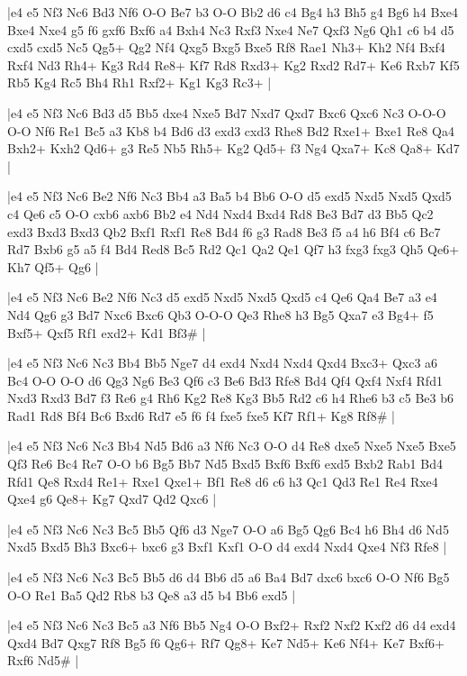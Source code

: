 \whitename{}
\blackname{}
\makegametitle
|e4 e5 Nf3 Nc6 Bd3 Nf6 O-O Be7 b3 O-O Bb2 d6 c4 Bg4 h3 Bh5 g4 Bg6 h4 Bxe4 Bxe4 Nxe4 g5 f6 gxf6 Bxf6 a4 Bxh4 Nc3 Rxf3 Nxe4 Ne7 Qxf3 Ng6 Qh1 c6 b4 d5 cxd5 cxd5 Nc5 Qg5+ Qg2 Nf4 Qxg5 Bxg5 Bxe5 Rf8 Rae1 Nh3+ Kh2 Nf4 Bxf4 Rxf4 Nd3 Rh4+ Kg3 Rd4 Re8+ Kf7 Rd8 Rxd3+ Kg2 Rxd2 Rd7+ Ke6 Rxb7 Kf5 Rb5 Kg4 Rc5 Bh4 Rh1 Rxf2+ Kg1 Kg3 Rc3+  |

\whitename{}
\blackname{}
\makegametitle
|e4 e5 Nf3 Nc6 Bd3 d5 Bb5 dxe4 Nxe5 Bd7 Nxd7 Qxd7 Bxc6 Qxc6 Nc3 O-O-O O-O Nf6 Re1 Bc5 a3 Kb8 b4 Bd6 d3 exd3 cxd3 Rhe8 Bd2 Rxe1+ Bxe1 Re8 Qa4 Bxh2+ Kxh2 Qd6+ g3 Re5 Nb5 Rh5+ Kg2 Qd5+ f3 Ng4 Qxa7+ Kc8 Qa8+ Kd7  |

\whitename{}
\blackname{}
\makegametitle
|e4 e5 Nf3 Nc6 Be2 Nf6 Nc3 Bb4 a3 Ba5 b4 Bb6 O-O d5 exd5 Nxd5 Nxd5 Qxd5 c4 Qe6 c5 O-O cxb6 axb6 Bb2 e4 Nd4 Nxd4 Bxd4 Rd8 Be3 Bd7 d3 Bb5 Qc2 exd3 Bxd3 Bxd3 Qb2 Bxf1 Rxf1 Re8 Bd4 f6 g3 Rad8 Be3 f5 a4 h6 Bf4 c6 Bc7 Rd7 Bxb6 g5 a5 f4 Bd4 Red8 Bc5 Rd2 Qc1 Qa2 Qe1 Qf7 h3 fxg3 fxg3 Qh5 Qe6+ Kh7 Qf5+ Qg6  |

\whitename{}
\blackname{}
\makegametitle
|e4 e5 Nf3 Nc6 Be2 Nf6 Nc3 d5 exd5 Nxd5 Nxd5 Qxd5 c4 Qe6 Qa4 Be7 a3 e4 Nd4 Qg6 g3 Bd7 Nxc6 Bxc6 Qb3 O-O-O Qe3 Rhe8 h3 Bg5 Qxa7 e3 Bg4+ f5 Bxf5+ Qxf5 Rf1 exd2+ Kd1 Bf3\#  |

\whitename{}
\blackname{}
\makegametitle
|e4 e5 Nf3 Nc6 Nc3 Bb4 Bb5 Nge7 d4 exd4 Nxd4 Nxd4 Qxd4 Bxc3+ Qxc3 a6 Bc4 O-O O-O d6 Qg3 Ng6 Be3 Qf6 c3 Be6 Bd3 Rfe8 Bd4 Qf4 Qxf4 Nxf4 Rfd1 Nxd3 Rxd3 Bd7 f3 Re6 g4 Rh6 Kg2 Re8 Kg3 Bb5 Rd2 c6 h4 Rhe6 b3 c5 Be3 b6 Rad1 Rd8 Bf4 Bc6 Bxd6 Rd7 e5 f6 f4 fxe5 fxe5 Kf7 Rf1+ Kg8 Rf8\#  |

\whitename{}
\blackname{}
\makegametitle
|e4 e5 Nf3 Nc6 Nc3 Bb4 Nd5 Bd6 a3 Nf6 Nc3 O-O d4 Re8 dxe5 Nxe5 Nxe5 Bxe5 Qf3 Re6 Bc4 Re7 O-O b6 Bg5 Bb7 Nd5 Bxd5 Bxf6 Bxf6 exd5 Bxb2 Rab1 Bd4 Rfd1 Qe8 Rxd4 Re1+ Rxe1 Qxe1+ Bf1 Re8 d6 c6 h3 Qc1 Qd3 Re1 Re4 Rxe4 Qxe4 g6 Qe8+ Kg7 Qxd7 Qd2 Qxc6  |

\whitename{}
\blackname{}
\makegametitle
|e4 e5 Nf3 Nc6 Nc3 Bc5 Bb5 Qf6 d3 Nge7 O-O a6 Bg5 Qg6 Bc4 h6 Bh4 d6 Nd5 Nxd5 Bxd5 Bh3 Bxc6+ bxc6 g3 Bxf1 Kxf1 O-O d4 exd4 Nxd4 Qxe4 Nf3 Rfe8  |

\whitename{}
\blackname{}
\makegametitle
|e4 e5 Nf3 Nc6 Nc3 Bc5 Bb5 d6 d4 Bb6 d5 a6 Ba4 Bd7 dxc6 bxc6 O-O Nf6 Bg5 O-O Re1 Ba5 Qd2 Rb8 b3 Qe8 a3 d5 b4 Bb6 exd5  |

\whitename{}
\blackname{}
\makegametitle
|e4 e5 Nf3 Nc6 Nc3 Bc5 a3 Nf6 Bb5 Ng4 O-O Bxf2+ Rxf2 Nxf2 Kxf2 d6 d4 exd4 Qxd4 Bd7 Qxg7 Rf8 Bg5 f6 Qg6+ Rf7 Qg8+ Ke7 Nd5+ Ke6 Nf4+ Ke7 Bxf6+ Rxf6 Nd5\#  |

